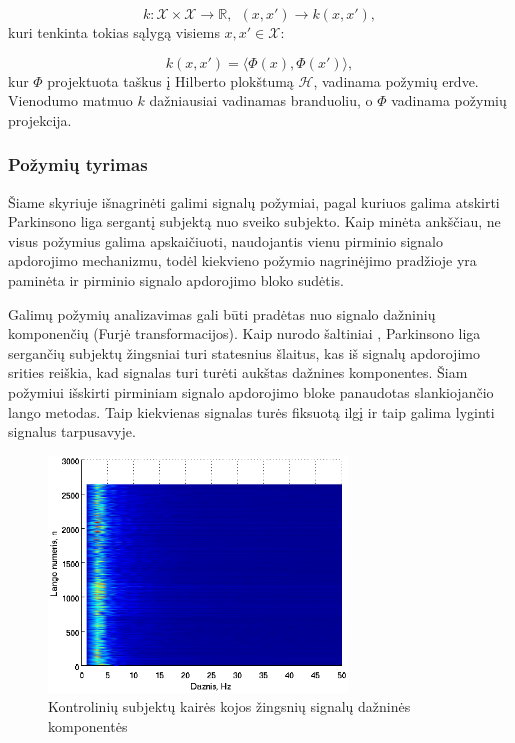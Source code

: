 \documentclass[]{vgtuef}
\begin{document}
\begin{equation}
  k: \mathcal{X} \times \mathcal{X} \rightarrow \mathbb{R}, ~~ (x,x')
  \rightarrow k(x,x'),
\end{equation}
kuri tenkinta tokias sąlygą visiems $x,x' \in \mathcal{X}$:

\begin{equation}
  k(x,x') = \langle \Phi(x), \Phi(x') \rangle,
\end{equation}
kur $\Phi$ projektuota taškus į Hilberto plokštumą $\mathcal{H}$, vadinama požymių erdve. Vienodumo matmuo $k$ dažniausiai vadinamas branduoliu, o $\Phi$ vadinama požymių projekcija.

\subsubsection{Požymių tyrimas}

Šiame skyriuje išnagrinėti galimi signalų požymiai, pagal kuriuos galima atskirti Parkinsono liga sergantį subjektą nuo sveiko subjekto. Kaip minėta ankščiau, ne visus požymius galima apskaičiuoti, naudojantis vienu pirminio signalo apdorojimo mechanizmu, todėl kiekvieno požymio nagrinėjimo pradžioje yra paminėta ir pirminio signalo apdorojimo bloko sudėtis.

Galimų požymių analizavimas gali būti pradėtas nuo signalo dažninių komponenčių (Furjė transformacijos). Kaip nurodo šaltiniai \cite{wiki_parkinsons},  Parkinsono liga sergančių subjektų žingsniai turi statesnius šlaitus, kas iš signalų apdorojimo srities reiškia, kad signalas turi turėti aukštas dažnines komponentes. Šiam požymiui išskirti pirminiam signalo apdorojimo bloke panaudotas slankiojančio lango metodas. Taip kiekvienas signalas turės fiksuotą ilgį ir taip galima lyginti signalus tarpusavyje.

\begin{figure}[!t]
  \centering
  \includegraphics[width=300px]{figures/co_fft.eps}
  \caption{Kontrolinių subjektų kairės kojos žingsnių signalų dažninės komponentės}
  \label{fig:co_fft}
\end{figure}
\end{document}
